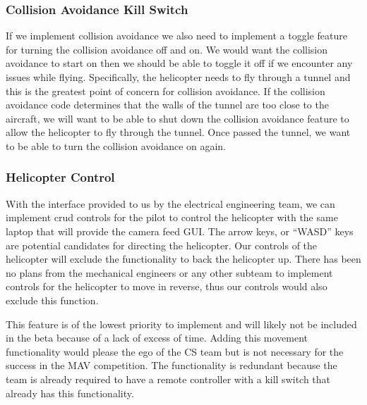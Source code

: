 \documentclass[onecolumn, oneside, letterpaper, draftclsnofoot, 10pt, compsoc]{IEEEtran}
\begin{document}
\subsubsection{Collision Avoidance Kill Switch}
If we implement collision avoidance we also need to implement a toggle feature for turning the collision avoidance off and on. We would want the collision avoidance to start on then we should be able to toggle it off if we encounter any issues while flying. Specifically, the helicopter needs to fly through a tunnel and this is the greatest point of concern for collision avoidance. If the collision avoidance code determines that the walls of the tunnel are too close to the aircraft, we will want to be able to shut down the collision avoidance feature to allow the helicopter to fly through the tunnel. Once passed the tunnel, we want to be able to turn the collision avoidance on again.

\subsubsection{Helicopter Control}
With the interface provided to us by the electrical engineering team, we can implement crud controls for the pilot to control the helicopter with the same laptop that will provide the camera feed GUI. The arrow keys, or ``WASD'' keys are potential candidates for directing the helicopter. Our controls of the helicopter will exclude the functionality to back the helicopter up. There has been no plans from the mechanical engineers or any other subteam to implement controls for the helicopter to move in reverse, thus our controls would also exclude this function.

\noindent
\newline
This feature is of the lowest priority to implement and will likely not be included in the beta because of a lack of excess of time. Adding this movement functionality would please the ego of the CS team but is not necessary for the success in the MAV competition. The functionality is redundant because the team is already required to have a remote controller with a kill switch that already has this functionality.

\clearpage
\medskip


\end{document}
